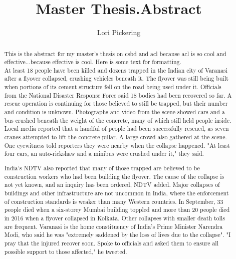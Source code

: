 \documentclass[../../main/main.tex]{subfiles}
\begin{document}
\title{Master Thesis.Abstract}
\author{Lori Pickering}
\begin{abstract}


This is the abstract for my master's thesis on \Gls{csbd} and \Gls{acl} because \gls{acl} is so cool and effective...because effective is cool.  Here is some text for formatting.\\

At least 18 people have been killed and dozens trapped in the Indian city of Varanasi after a flyover collapsed, crushing vehicles beneath it.
The flyover was still being built when portions of its cement structure fell on the road being used under it.
Officials from the National Disaster Response Force said 18 bodies had been recovered so far.
A rescue operation is continuing for those believed to still be trapped, but their number and condition is unknown.
Photographs and video from the scene showed cars and a bus crushed beneath the weight of the concrete, many of which still held people inside.
Local media reported that a handful of people had been successfully rescued, as seven cranes attempted to lift the concrete pillar. A large crowd also gathered at the scene.
One eyewitness told reporters they were nearby when the collapse happened. "At least four cars, an auto-rickshaw and a minibus were crushed under it," they said.

India's NDTV also reported that many of those trapped are believed to be construction workers who had been building the flyover.
The cause of the collapse is not yet known, and an inquiry has been ordered, NDTV added.
Major collapses of buildings and other infrastructure are not uncommon in India, where the enforcement of construction standards is weaker than many Western countries.
In September, 33 people died when a six-storey Mumbai building toppled and more than 20 people died in 2016 when a flyover collapsed in Kolkata.
Other collapses with smaller death tolls are frequent.
Varanasi is the home constituency of India's Prime Minister Narendra Modi, who said he was "extremely saddened by the loss of lives due to the collapse".
"I pray that the injured recover soon. Spoke to officials and asked them to ensure all possible support to those affected," he tweeted.
\end{abstract}
\end{document}
